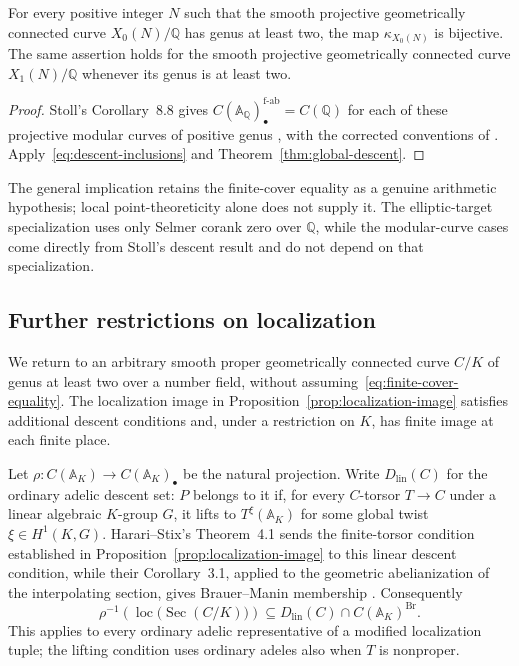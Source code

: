 \begin{corollary}\label{cor:global-modular-curves}
For every positive integer $N$ such that the smooth projective
geometrically connected curve $X_0(N)/\mathbb Q$ has genus at least two,
the map $\kappa_{X_0(N)}$ is bijective. The same assertion holds for the
smooth projective geometrically connected curve $X_1(N)/\mathbb Q$
whenever its genus is at least two.
\end{corollary}

\begin{proof}
Stoll's Corollary~8.8 gives
$C(\mathbb A_{\mathbb Q})_\bullet^{\mathrm{f\text{-}ab}}=C(\mathbb Q)$
for each of these projective modular curves of positive genus
\cite{StollFiniteDescent}, with the corrected conventions of
\cite{StollFiniteDescentErrata}. Apply~\eqref{eq:descent-inclusions}
and Theorem~\ref{thm:global-descent}.
\end{proof}

The general implication retains the finite-cover equality as a genuine
arithmetic hypothesis; local point-theoreticity alone does not supply
it. The elliptic-target specialization uses only Selmer corank zero over
$\mathbb Q$, while the modular-curve cases come directly from Stoll's
descent result and do not depend on that specialization.

\subsection{Further restrictions on localization}
\label{subsec:global-restrictions}

We return to an arbitrary smooth proper geometrically connected curve
$C/K$ of genus at least two over a number field, without
assuming~\eqref{eq:finite-cover-equality}. The localization image in
Proposition~\ref{prop:localization-image} satisfies additional descent
conditions and, under a restriction on $K$, has finite image at each
finite place.

Let $\rho:C(\mathbb A_K)\to C(\mathbb A_K)_\bullet$ be the natural
projection. Write $D_{\mathrm{lin}}(C)$ for the ordinary adelic descent
set: $P$ belongs to it if, for every $C$-torsor $T\to C$ under a linear
algebraic $K$-group $G$, it lifts to $T^\xi(\mathbb A_K)$ for some
global twist $\xi\in H^1(K,G)$. Harari--Stix's Theorem~4.1 sends the
finite-torsor condition established in
Proposition~\ref{prop:localization-image} to this linear descent
condition, while their Corollary~3.1, applied to the geometric
abelianization of the interpolating section, gives Brauer--Manin
membership
\cite[preprint version, Corollary~3.1 and Theorem~4.1]{HarariStixFiniteDescent}.
Consequently
\begin{equation}\label{eq:localization-obstructions}
 \rho^{-1}\!\left(\operatorname{loc}\bigl(\operatorname{Sec}(C/K)\bigr)\right)
 \subseteq D_{\mathrm{lin}}(C)\cap C(\mathbb A_K)^{\operatorname{Br}}.
\end{equation}
This applies to every ordinary adelic representative of a modified
localization tuple; the lifting condition uses ordinary adeles also
when $T$ is nonproper.

